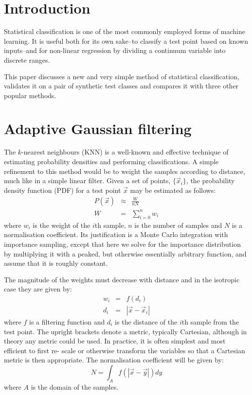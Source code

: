 \newcommand{\filtfunc} f

\section{Introduction}

Statistical classification is one of the most commonly employed
forms of machine learning.  It is useful both for its own sake--to
classify a test point based on known inputs--and for non-linear
regression by dividing a continuum variable into discrete
ranges.

This paper discusses a new and very simple method of statistical
classification, validates it on a pair of synthetic test classes
and compares it with three other popular methods.

\section{Adaptive Gaussian filtering}
\label{AGF_intro}

The $k$-nearest neighbours (KNN) is a well-known and effective technique of
estimating probability densities and performing classifications.
A simple refinement to this method would be to weight the samples
according to distance, much like in a simple linear filter.
Given a set of points, $\lbrace \vec x_i\rbrace$, 
the probability density function (PDF)
for a test point $\vec x$ may be estimated as follows:
\begin{eqnarray}
P(\vec x) & \approx & \frac{W}{n N} \label{pdf_est} \\
W & = & \sum_{i=0}^n w_i
\label{W_def}
\end{eqnarray}
where $w_i$ is the weight of the $i$th sample, $n$ is the number
of samples and $N$ is a normalisation coefficient.  Its justification
is a Monte Carlo integration with importance sampling, except that
here we solve for the importance distribution by multiplying it
with a peaked, but otherwise essentially arbitrary function, and
assume that it is roughly constant.

The magnitude
of the weights must decrease with distance and in the isotropic
case they are given by:
\begin{eqnarray}
w_i & = & \filtfunc(d_i) \\
d_i & = & | \vec x - \vec x_i |
\end{eqnarray}
where $\filtfunc$ is a filtering function and $d_i$ is the 
distance of the $i$th
sample from the test point.  The upright brackets denote a metric,
typically Cartesian, although in theory any metric could be used.
In practice, it is often simplest and most efficient to first re-
scale or otherwise transform the variables so that a Cartesian metric
is then appropriate.  The normalisation coefficient will be given by:
\begin{equation}
N =  \int_A \filtfunc(|\vec x - \vec y|) dy
\end{equation}
where $A$ is the domain of the samples.

